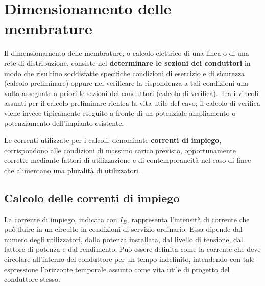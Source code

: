 \chapter{Dimensionamento delle membrature}
Il dimensionamento delle membrature, o calcolo elettrico di una linea o di una rete di distribuzione, consiste nel \textbf{determinare le sezioni dei conduttori} in modo che risultino soddisfatte specifiche condizioni di esercizio e di sicurezza (calcolo preliminare) oppure nel verificare la rispondenza a tali condizioni una volta assegnate a priori le sezioni dei conduttori (calcolo di verifica). Tra i vincoli assunti per il calcolo preliminare rientra la vita utile del cavo; il calcolo di verifica viene invece tipicamente eseguito a fronte di un potenziale ampliamento o potenziamento dell'impianto esistente.

Le correnti utilizzate per i calcoli, denominate \textbf{correnti di impiego}, corrispondono alle condizioni di massimo carico previsto, opportunamente corrette mediante fattori di utilizzazione e di contemporaneità nel caso di linee che alimentano una pluralità di utilizzatori.

\section{Calcolo delle correnti di impiego}
La corrente di impiego, indicata con $I_B$, rappresenta l'intensità di corrente che può fluire in un circuito in condizioni di servizio ordinario. Essa dipende dal numero degli utilizzatori, dalla potenza installata, dal livello di tensione, dal fattore di potenza e dal rendimento. Può essere definita come la corrente che deve circolare all'interno del conduttore per un tempo indefinito, intendendo con tale espressione l'orizzonte temporale assunto come vita utile di progetto del conduttore stesso.

